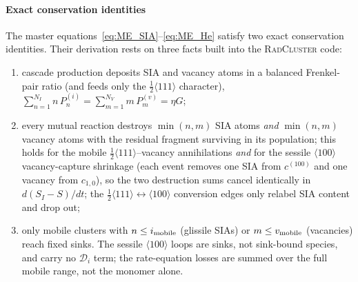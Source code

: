 \paragraph{Exact conservation identities}
The master equations~\eqref{eq:ME_SIA}--\eqref{eq:ME_He} satisfy two exact
conservation identities. Their derivation rests on three facts built into the
\textsc{RadCluster} code:
\begin{enumerate}
  \item[(i)] cascade production deposits SIA and vacancy atoms in a balanced
        Frenkel-pair ratio (and feeds only the $\tfrac12\langle111\rangle$
        character),
        $\sum_{n=1}^{N_I} n\,P_n^{(i)}
         = \sum_{m=1}^{N_V} m\,P_m^{(v)} = \eta G$;
  \item[(ii)] every mutual reaction destroys $\min(n,m)$ SIA atoms \emph{and}
        $\min(n,m)$ vacancy atoms with the residual fragment surviving in its
        population; this holds for the mobile $\tfrac12\langle111\rangle$--vacancy
        annihilations \emph{and} for the sessile $\langle100\rangle$
        vacancy-capture shrinkage (each event removes one SIA from
        $c^{(100)}$ and one vacancy from $c_{1,0}$), so the two destruction
        sums cancel identically in $d(S_I-S)/dt$; the
        $\tfrac12\langle111\rangle\!\leftrightarrow\!\langle100\rangle$
        conversion edges only relabel SIA content and drop out;
  \item[(iii)] only mobile clusters with $n \le i_{\rm mobile}$ (glissile SIAs)
        or $m \le v_{\rm mobile}$ (vacancies) reach fixed sinks. The sessile
        $\langle100\rangle$ loops are sinks, not sink-bound species, and carry no
        $\mathcal{D}_i$ term; the rate-equation losses are summed over the full
        mobile range, not the monomer alone.
\end{enumerate}

